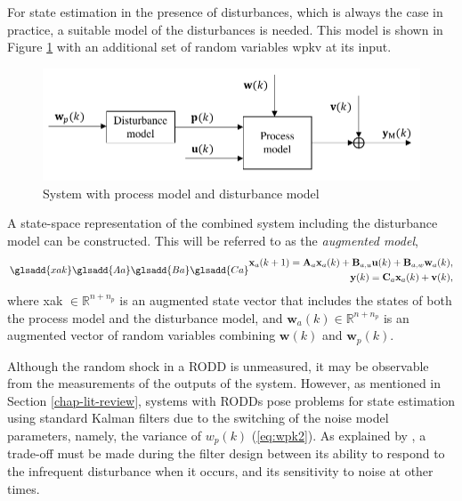 For state estimation in the presence of disturbances, which is always the case in practice, a suitable model of the disturbances is needed. This model is shown in Figure \ref{fig:model_diag_wpupwvy} with an additional set of random variables \gls{wpkv} at its input.
\begin{figure}[htp]
	\centering
	\includegraphics[width=12.5cm]{images/model_diag_wpupwvy.pdf}
	\caption{System with process model and disturbance model}
	\label{fig:model_diag_wpupwvy}
\end{figure}

A state-space representation of the combined system including the disturbance model can be constructed. This will be referred to as the \textit{augmented model},
\begin{equation} \label{eq:ss_rep_xa} \glsadd{xak} \glsadd{Aa} \glsadd{Ba} \glsadd{Ca}
	\begin{aligned}
		\mathbf{x}_a(k+1) = \mathbf{A}_a \mathbf{x}_a(k) + \mathbf{B}_{a,u} \mathbf{u}(k) + \mathbf{B}_{a,w} \mathbf{w}_{a}(k), \\
		\mathbf{y}(k) = \mathbf{C}_a \mathbf{x}_a(k) + \mathbf{v}(k),
	\end{aligned}
\end{equation}
where \gls{xak} $\in \mathbb{R}^{n+n_p}$ is an augmented state vector that includes the states of both the process model and the disturbance model, and $\mathbf{w}_a(k) \in \mathbb{R}^{n+n_p}$ is an augmented vector of random variables combining $\mathbf{w}(k)$ and $\mathbf{w}_p(k)$.

Although the random shock in a \gls{RODD} is unmeasured, it may be observable from the measurements of the outputs of the system. However, as mentioned in Section \ref{chap-lit-review}, systems with \gls{RODD}s pose problems for state estimation using standard Kalman filters due to the switching of the noise model parameters, namely, the variance of $w_p(k)$ (\ref{eq:wpk2}). As explained by \cite{andersson_adaptive_1985}, a trade-off must be made during the filter design between its ability to respond to the infrequent disturbance when it occurs, and its sensitivity to noise at other times.


